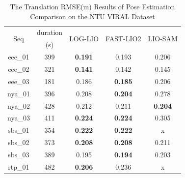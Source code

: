 \documentclass[letterpaper, 10 pt, conference]{ieeeconf}  %
\begin{document}
\begin{table}[htb!]
        \caption{The Translation RMSE(m) Results of Pose Estimation Comparison on the NTU VIRAL Dataset}
        \centering
        \begin{tabular}{c|c|c|c|c}
                \toprule
                \multirow{2}{*}{Seq} & duration & \multirow{2}{*}{LOG-LIO} & \multirow{2}{*}{FAST-LIO2} & \multirow{2}{*}{LIO-SAM} \\
                                     & (s)      &                          &                            &                          \\

                \midrule
                eee\_01              & 399      & \textbf{0.191}           & 0.193                      & 0.206                    \\
                eee\_02              & 321      & \textbf{0.141}           & 0.142                      & 0.145                    \\
                eee\_03              & 181      & 0.186                    & \textbf{0.185}             & 0.206                    \\
                nya\_01              & 396      & 0.208                    & \textbf{0.204}             & 0.278                    \\
                nya\_02              & 428      & 0.212                    & 0.211                      & \textbf{0.204}           \\
                nya\_03              & 411      & \textbf{0.224}           & \textbf{0.224}             & 0.305                    \\
                sbs\_01              & 354      & \textbf{0.222}           & \textbf{0.222}             & x                        \\
                sbs\_02              & 373      & \textbf{0.208}           & \textbf{0.208}             & 0.211                    \\
                sbs\_03              & 389      & 0.195                    & \textbf{0.194}             & 0.203                    \\
                rtp\_01              & 482      & \textbf{0.206}           & 0.236                      & x                        \\

\end{tabular}
\end{table}
\end{document}
